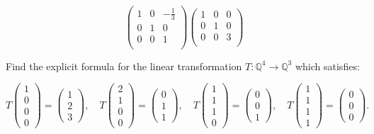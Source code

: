 \documentclass{eh-homework}
\begin{document}
\begin{question}{2}
\[\begin{pmatrix}
                1 & 0 &  -\frac{1}{3} \\
                0 & 1 &  0 \\
                0 & 0 &  1 \\
            \end{pmatrix}
            \begin{pmatrix}
                1 & 0 &  0 \\
                0 & 1 &  0 \\
                0 & 0 &  3 \\
            \end{pmatrix}
        \]
    \end{question}

    \begin{question}{3}
        Find the explicit formula for the linear transformation \( T : \mathbb{Q}^4 \to \mathbb{Q}^3 \) which satisfies:

        \[
        T\begin{pmatrix} 1 \\ 0 \\ 0 \\ 0 \end{pmatrix} = \begin{pmatrix} 1 \\ 2 \\ 3 \end{pmatrix}, \quad
        T\begin{pmatrix} 2 \\ 1 \\ 0 \\ 0 \end{pmatrix} = \begin{pmatrix} 0 \\ 1 \\ 1 \end{pmatrix}, \quad
        T\begin{pmatrix} 1 \\ 1 \\ 1 \\ 0 \end{pmatrix} = \begin{pmatrix} 0 \\ 0 \\ 1 \end{pmatrix}, \quad
        T\begin{pmatrix} 1 \\ 1 \\ 1 \\ 1 \end{pmatrix} = \begin{pmatrix} 0 \\ 0 \\ 0 \end{pmatrix}.
        \]
        \tcblower


\end{question}
\end{document}
